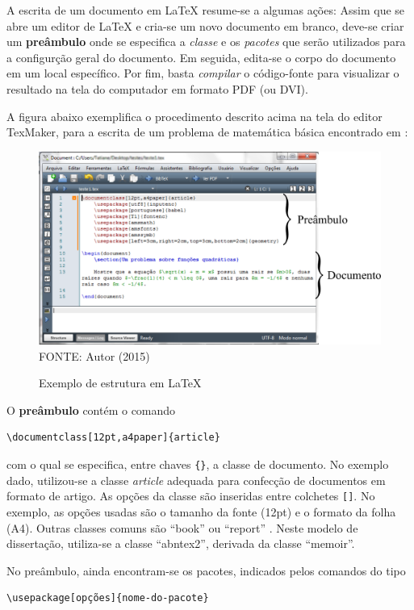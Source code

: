 A escrita de um documento em LaTeX resume-se a algumas ações: Assim que se abre um editor de LaTeX e cria-se um novo documento em branco, deve-se criar um \textbf{preâmbulo} onde se especifica a \textit{classe} e os \textit{pacotes} que serão utilizados para a configurção geral do documento. Em seguida, edita-se o corpo do documento em um local específico. Por fim, basta \textit{compilar} o código-fonte para visualizar o resultado na tela do computador em formato PDF (ou DVI).

A figura abaixo exemplifica o procedimento descrito acima na tela do editor TexMaker, para a escrita de um problema de matemática básica encontrado em :
	\begin{figure}[H]
	\centering
	\caption{Exemplo de estrutura em LaTeX}
	\includegraphics[scale=0.5]
	{img/fig01.png}\label{fig01}\\
	FONTE: Autor (2015)
	\end{figure}
	O \textbf{preâmbulo} contém o comando
\begin{verbatim}
\documentclass[12pt,a4paper]{article}
\end{verbatim}
com o qual se especifica, entre chaves \verb!{}!, a classe de documento. No exemplo dado, utilizou-se a classe \textit{article} adequada para confecção de documentos em formato de artigo. As opções da classe são inseridas entre colchetes \verb![]!. No exemplo, as opções usadas são o tamanho da fonte (12pt) e o formato da folha (A4). Outras classes comuns são ``book'' ou ``report'' \cite{latex-walter}. Neste modelo de dissertação, utiliza-se a classe ``abntex2'', derivada da classe ``memoir''.

No preâmbulo, ainda encontram-se os pacotes, indicados pelos comandos do tipo
\begin{verbatim}
\usepackage[opções]{nome-do-pacote}
\end{verbatim}

